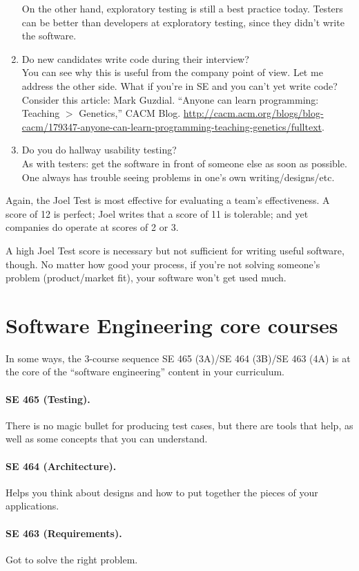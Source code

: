 \documentclass[11pt]{article}
\begin{document}
\begin{enumerate}
  On the other hand, exploratory testing is still a best practice today. Testers can be better than developers at exploratory testing, since they didn't write the software.
\item Do new candidates write code during their interview?\\
  You can see why this is useful from the company point of view. Let me address the other side. What if you're in SE and you can't yet write code? Consider this article: Mark Guzdial. ``Anyone can learn programming: Teaching $>$ Genetics,'' CACM Blog. \url{http://cacm.acm.org/blogs/blog-cacm/179347-anyone-can-learn-programming-teaching-genetics/fulltext}.
\item Do you do hallway usability testing?\\
  As with testers: get the software in front of someone else as soon as possible. One always has
  trouble seeing problems in one's own writing/designs/etc.
\end{enumerate}

Again, the Joel Test is most effective for evaluating a team's effectiveness.
A score of 12 is perfect; Joel writes that a score of 11 is tolerable; and yet
companies do operate at scores of 2 or 3.

A high Joel Test score is necessary but not sufficient for writing
useful software, though. No matter how good your process, if you're not solving
someone's problem (product/market fit), your software won't get used much.

\section*{Software Engineering core courses}

In some ways, the 3-course sequence SE 465 (3A)/SE 464 (3B)/SE 463 (4A)
is at the core of the ``software engineering'' content in your curriculum.

\paragraph{SE 465 (Testing).} There is no magic bullet for producing test cases,
but there are tools that help, as well as some concepts that you can understand.
\paragraph{SE 464 (Architecture).} Helps you think about designs and how to put together
the pieces of your applications.
\paragraph{SE 463 (Requirements).} Got to solve the right problem.
\end{document}
